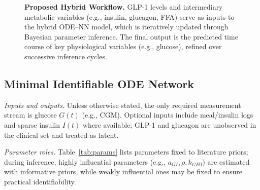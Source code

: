 \documentclass[9pt,shortpaper,twoside,web]{ieeecolor}
\begin{document}
\begin{figure}[ht]
{
}

\caption{\textbf{Proposed Hybrid Workflow.} GLP-1 levels and intermediary metabolic variables (e.g., insulin, glucagon, FFA) serve as inputs to the hybrid ODE–NN model, which is iteratively updated through Bayesian parameter inference. The final output is the predicted time course of key physiological variables (e.g., glucose), refined over successive inference cycles.}
\label{fig:hybrid_architecture_cleaner}
\end{figure}

\subsection{Minimal Identifiable ODE Network}

\noindent\textit{Inputs and outputs.} Unless otherwise stated, the only required measurement stream is glucose $G(t)$ (e.g., CGM). Optional inputs include meal/insulin logs and sparse insulin $I(t)$ where available; GLP-1 and glucagon are unobserved in the clinical set and treated as latent.

\noindent\textit{Parameter roles.} Table~\ref{tab:params} lists parameters fixed to literature priors; during inference, highly influential parameters (e.g., $a_{GI}, \rho, k_{GE0}$) are estimated with informative priors, while weakly influential ones may be fixed to ensure practical identifiability.
\end{document}
